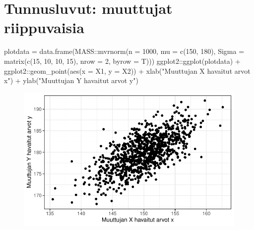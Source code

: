 \documentclass[
]{report}
\newenvironment{Shaded}{\begin{snugshade}}{\end{snugshade}}
\newcommand{\AttributeTok}[1]{\textcolor[rgb]{0.40,0.45,0.13}{#1}}
\newcommand{\DecValTok}[1]{\textcolor[rgb]{0.68,0.00,0.00}{#1}}
\newcommand{\FunctionTok}[1]{\textcolor[rgb]{0.28,0.35,0.67}{#1}}
\newcommand{\NormalTok}[1]{\textcolor[rgb]{0.00,0.23,0.31}{#1}}
\newcommand{\OtherTok}[1]{\textcolor[rgb]{0.00,0.23,0.31}{#1}}
\newcommand{\SpecialCharTok}[1]{\textcolor[rgb]{0.37,0.37,0.37}{#1}}
\newcommand{\StringTok}[1]{\textcolor[rgb]{0.13,0.47,0.30}{#1}}
\begin{document}
\hypertarget{tunnusluvut-muuttujat-riippuvaisia}{%
\section{Tunnusluvut: muuttujat
riippuvaisia}\label{tunnusluvut-muuttujat-riippuvaisia}}

\begin{Shaded}
\begin{Highlighting}[]
\NormalTok{plotdata }\OtherTok{=} \FunctionTok{data.frame}\NormalTok{(MASS}\SpecialCharTok{::}\FunctionTok{mvrnorm}\NormalTok{(}\AttributeTok{n =} \DecValTok{1000}\NormalTok{, }\AttributeTok{mu =} \FunctionTok{c}\NormalTok{(}\DecValTok{150}\NormalTok{, }\DecValTok{180}\NormalTok{), }\AttributeTok{Sigma =} \FunctionTok{matrix}\NormalTok{(}\FunctionTok{c}\NormalTok{(}\DecValTok{15}\NormalTok{, }\DecValTok{10}\NormalTok{, }\DecValTok{10}\NormalTok{, }\DecValTok{15}\NormalTok{), }\AttributeTok{nrow =} \DecValTok{2}\NormalTok{, }\AttributeTok{byrow =}\NormalTok{ T)))}
\NormalTok{ggplot2}\SpecialCharTok{::}\FunctionTok{ggplot}\NormalTok{(plotdata) }\SpecialCharTok{+}\NormalTok{ ggplot2}\SpecialCharTok{::}\FunctionTok{geom\_point}\NormalTok{(}\FunctionTok{aes}\NormalTok{(}\AttributeTok{x =}\NormalTok{ X1, }\AttributeTok{y =}\NormalTok{ X2)) }\SpecialCharTok{+} \FunctionTok{xlab}\NormalTok{(}\StringTok{"Muuttujan X havaitut arvot x"}\NormalTok{) }\SpecialCharTok{+} \FunctionTok{ylab}\NormalTok{(}\StringTok{"Muuttujan Y havaitut arvot y"}\NormalTok{)}
\end{Highlighting}
\end{Shaded}

\begin{figure}[H]

{\centering \includegraphics{Tiivistelma6_files/figure-pdf/unnamed-chunk-3-1.pdf}

}

\end{figure}
\end{document}
